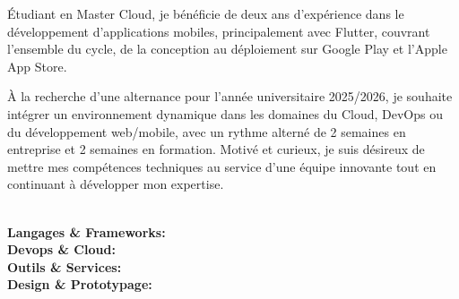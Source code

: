 \documentclass[9pt]{developercv} %
\begin{document}
\begin{minipage}[t]{\textwidth}
    \vspace{-6pt}

    Étudiant en Master Cloud, je bénéficie de deux ans d'expérience dans le développement d'applications mobiles, principalement avec Flutter, couvrant l'ensemble du cycle, de la conception au déploiement sur Google Play et l'Apple App Store.

    À la recherche d'une alternance pour l'année universitaire 2025/2026, je souhaite intégrer un environnement dynamique dans les domaines du Cloud, DevOps ou du développement web/mobile, avec un rythme alterné de 2 semaines en entreprise et 2 semaines en formation. Motivé et curieux, je suis désireux de mettre mes compétences techniques au service d'une équipe innovante tout en continuant à développer mon expertise.
\end{minipage}
\begin{minipage}[t]{\textwidth}
    \\
    \vspace{6pt}
    \textbf{Langages \& Frameworks: } \\
    \vspace{6pt}
    \textbf{Devops \& Cloud: } \\
    \vspace{6pt}
    \textbf{Outils \& Services: } \\
    \vspace{6pt}
    \textbf{Design \& Prototypage: } 
    \vspace{-12pt}
\end{minipage}

\end{document}
